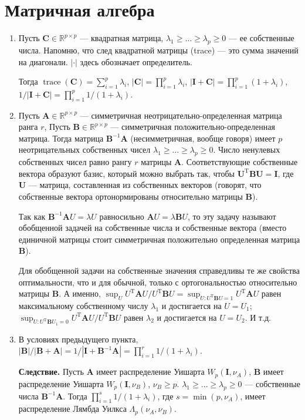 \documentclass[12 pt]{article}
\DeclareMathOperator{\trace}{trace}
\begin{document}
\section{Матричная алгебра}
\begin{enumerate}
\item
Пусть $\mathbf{C}\in \mathbb{R}^{p\times p}$ --- квадратная матрица,
$\lambda_1\ge \ldots \ge \lambda_p\ge 0$ --- ее собственные числа. Напомню, что след квадратной матрицы (trace) ---
это сумма значений на диагонали. $|\cdot|$ здесь обозначает определитель.

Тогда $\trace(\mathbf{C})=\sum_{i=1}^p \lambda_i$, $|\mathbf{C}|=\prod_{i=1}^p \lambda_i$,
$|\mathbf{I}+\mathbf{C}|= \prod_{i=1}^p (1+\lambda_i)$,
$1/|\mathbf{I}+\mathbf{C}|= \prod_{i=1}^p 1/(1+\lambda_i)$.

\item
Пусть $\mathbf{A}\in \mathbb{R}^{p\times p}$ --- симметричная неотрицательно-определенная матрица ранга $r$,
Пусть $\mathbf{B}\in \mathbb{R}^{p\times p}$ --- симметричная положительно-определенная матрица.
Тогда матрица $\mathbf{B}^{-1}\mathbf{A}$ (несимметричная, вообще говоря) имеет $p$ неотрицательных
собственных чисел $\lambda_1\ge \ldots \ge \lambda_p\ge 0$. Число ненулевых собственных чисел равно
рангу $r$ матрицы $\mathbf{A}$. Соответствующие собственные вектора образуют базис,
который можно выбрать так, чтобы $\mathbf{U}^\mathrm{T}\mathbf{B}\mathbf{U} = \mathbf{I}$,
где $\mathbf{U}$ --- матрица, составленная из собственных векторов (говорят, что собственные вектора ортонормированы
относительно матрицы $\mathbf{B}$).

Так как $\mathbf{B}^{-1}\mathbf{A} U = \lambda U$ равносильно $\mathbf{A} U = \lambda \mathbf{B} U$,
то эту задачу называют обобщенной задачей на собственные числа и собственные вектора (вместо единичной матрицы стоит симметричная положительно
определенная матрица $\mathbf{B}$).

Для обобщенной задачи на собственные значения справедливы те же свойства оптимальности,
что и  для обычной, только с ортогональностью относительно матрицы $\mathbf{B}$.
А именно, $\sup_U   U^\mathrm{T}\mathbf{A}U/U^\mathrm{T}\mathbf{B}U = \sup_{U: U^\mathrm{T}\mathbf{B}U = 1} U^\mathrm{T}\mathbf{A}U$
равен максимальному собственному числу $\lambda_1$ и достигается на $U=U_1$;
$\sup_{U: U^\mathrm{T}\mathbf{B}U_1 = 0}   U^\mathrm{T}\mathbf{A}U/U^\mathrm{T}\mathbf{B}U$
равен $\lambda_2$ и достигается на $U=U_2$. И т.д.

\item
\label{item:3}
В условиях предыдущего пункта,
$|\mathbf{B}|/|\mathbf{B}+\mathbf{A}| = 1/|\mathbf{I}+\mathbf{B}^{-1}\mathbf{A}| = \prod_{i=1}^r 1/(1+\lambda_i)$.

\textbf{Следствие.} Пусть $\mathbf{A}$ имеет распределение Уишарта $W_p(\mathbf{I}, \nu_A)$, $\mathbf{B}$ имеет распределение Уишарта $W_p(\mathbf{I}, \nu_B)$,
$\nu_B \ge p$.
$\lambda_1\ge \ldots \ge \lambda_p\ge 0$ --- собственные числа $\mathbf{B}^{-1}\mathbf{A}$.
Тогда $\prod_{i=1}^s 1/(1+\lambda_i)$, где $s=\min(p,{\nu_A})$, имеет распределение Лямбда Уилкса $\Lambda_p(\nu_A, \nu_B)$.
\end{enumerate}
\end{document}
